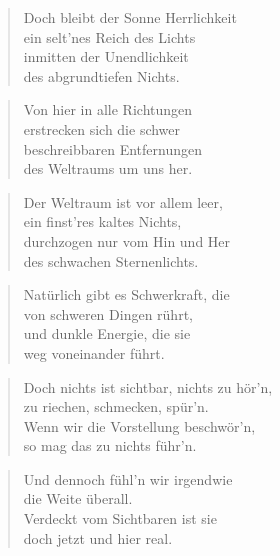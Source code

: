 \documentclass[10pt,a4paper]{article}
\begin{document}
\begin{paracol}{2}
\begin{verse}
Doch bleibt der Sonne Herrlichkeit \\
ein selt’nes Reich des Lichts \\
inmitten der Unendlichkeit \\
des abgrundtiefen Nichts. \\
\end{verse}

\begin{verse}
Von hier in alle Richtungen \\
erstrecken sich die schwer \\
beschreibbaren Entfernungen \\
des Weltraums um uns her. \\
\end{verse}

\begin{verse}
Der Weltraum ist vor allem leer, \\
ein finst’res kaltes Nichts, \\
durchzogen nur vom Hin und Her \\
des schwachen Sternenlichts. \\
\end{verse}

\begin{verse}
Natürlich gibt es Schwerkraft, die \\
von schweren Dingen rührt, \\
und dunkle Energie, die sie \\
weg voneinander führt. \\
\end{verse}

\begin{verse}
Doch nichts ist sichtbar, nichts zu hör’n, \\
zu riechen, schmecken, spür’n. \\
Wenn wir die Vorstellung beschwör’n, \\
so mag das zu nichts führ’n. \\
\end{verse}

\begin{verse}
Und dennoch fühl’n wir irgendwie \\
die Weite überall. \\
Verdeckt vom Sichtbaren ist sie \\
doch jetzt und hier real. \\
\end{verse}


\end{paracol}
\end{document}
